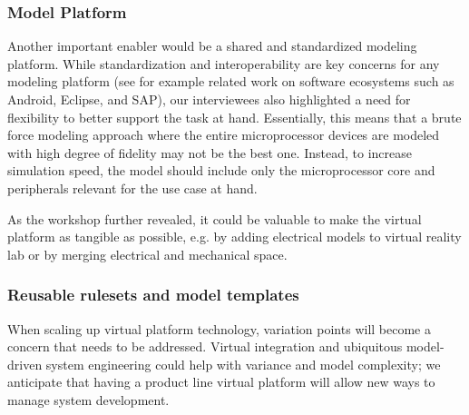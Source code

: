 \subsubsection{Model Platform}
Another important enabler would be a shared and standardized modeling platform.
While standardization and interoperability are key concerns for any modeling platform (see for example related work on software ecosystems such as Android, Eclipse, and SAP), our interviewees also highlighted a need for flexibility to better support the task at hand.
Essentially, this means that a brute force modeling approach where the entire microprocessor devices are modeled with high degree of fidelity may not be the best one.
Instead, to increase simulation speed, the model should include only the microprocessor core
and peripherals relevant for the use case at hand.

As the workshop further revealed, it could be valuable to make the virtual platform as tangible as possible, e.g. by adding electrical models to virtual reality lab or by merging electrical and mechanical space.

\subsubsection{Reusable rulesets and model templates}
When scaling up virtual platform technology, variation points will become a concern that needs to be addressed. Virtual integration and ubiquitous model-driven system engineering could help with variance and model complexity; we anticipate that having a product line virtual platform will allow new ways to manage system development.


